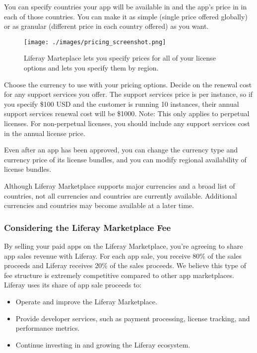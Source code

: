 You can specify countries your app will be available in and the app's
price in in each of those countries. You can make it as simple (single
price offered globally) or as granular (different price in each country
offered) as you want.

\begin{figure}
\centering
\texttt{[image: ./images/pricing\_screenshot.png]}
\caption{Liferay Marteplace lets you specify prices for all of your
license options and lets you specify them by region.}
\end{figure}

Choose the currency to use with your pricing options. Decide on the
renewal cost for any support services you offer. The support services
price is per instance, so if you specify \$100 USD and the customer is
running 10 instances, their annual support services renewal cost will be
\$1000. Note: This only applies to perpetual licenses. For non-perpetual
licenses, you should include any support services cost in the annual
license price.

Even after an app has been approved, you can change the currency type
and currency price of its license bundles, and you can modify regional
availability of license bundles.

Although Liferay Marketplace supports major currencies and a broad list
of countries, not all currencies and countries are currently available.
Additional currencies and countries may become available at a later
time.

\subsubsection{Considering the Liferay Marketplace
Fee}\label{considering-the-liferay-marketplace-fee}

By selling your paid apps on the Liferay Marketplace, you're agreeing to
share app sales revenue with Liferay. For each app sale, you receive
80\% of the sales proceeds and Liferay receives 20\% of the sales
proceeds. We believe this type of fee structure is extremely competitive
compared to other app marketplaces. Liferay uses its share of app sale
proceeds to:

\begin{itemize}
\tightlist
\item
  Operate and improve the Liferay Marketplace.
\item
  Provide developer services, such as payment processing, license
  tracking, and performance metrics.
\item
  Continue investing in and growing the Liferay ecosystem.
\end{itemize}

